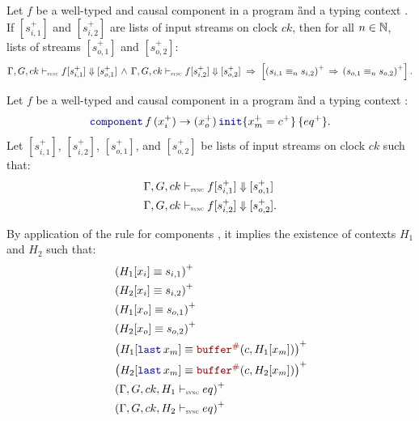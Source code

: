 \begin{theorem}[Determinism]
    \label{thm:semantics:grsync:theorems:determinism}
    Let $f$ be a well-typed and causal component in a program \G and a typing
    context \tyCtx. If $[s_{i, 1}^+]$ and $[s_{i, 2}^+]$ are lists of input streams on clock $ck$,
    then for all $n \in \mathbb{N}$, lists of streams $[s_{o, 1}^+]$ and $[s_{o, 2}^+]$:
    $$
        \Gamma, G, ck \vdash_{\textnormal{\tiny\textsc{sync}}} f[s_{i, 1}^+] \Downarrow [s_{o, 1}^+]
        \, \wedge \,
        \Gamma, G, ck \vdash_{\textnormal{\tiny\textsc{sync}}} f[s_{i, 2}^+] \Downarrow [s_{o, 2}^+]
        \; \Rightarrow \;
        \left[
            \left(s_{i, 1} \equiv_n s_{i, 2}\right)^+
            \, \Rightarrow \,
            \left(s_{o, 1} \equiv_n s_{o, 2}\right)^+
            \right].
    $$
\end{theorem}
\begin{skippableproof}
    Let $f$ be a well-typed and causal component in a program \G and a typing context \tyCtx:
    $$\component{f}{x_i^+}{x_o^+}{eq^+}{x_m^+ = c^+}.$$
    Let $[s_{i, 1}^+]$, $[s_{i, 2}^+]$, $[s_{o, 1}^+]$, and $[s_{o, 2}^+]$ be lists of input streams
    on  clock $ck$ such that:
    \begin{align*}
         & \Gamma, G, ck \vdash_{\textnormal{\tiny\textsc{sync}}} f[s_{i, 1}^+] \Downarrow [s_{o, 1}^+]  \\
         & \Gamma, G, ck \vdash_{\textnormal{\tiny\textsc{sync}}} f[s_{i, 2}^+] \Downarrow [s_{o, 2}^+].
    \end{align*}

    By application of the rule for components , it implies
    the existence of contexts $H_1$ and $H_2$ such that:
    \begin{align*}
         & \left(H_1[x_i] \equiv s_{i, 1}\right)^+                     \\
         & \left(H_2[x_i] \equiv s_{i, 2}\right)^+                     \\
         & \left(H_1[x_o] \equiv s_{o, 1}\right)^+                     \\
         & \left(H_2[x_o] \equiv s_{o, 2}\right)^+                     \\
         & \left(H_1[\last{x_m}] \equiv \buffer{c}{H_1[x_m]} \right)^+ \\
         & \left(H_2[\last{x_m}] \equiv \buffer{c}{H_2[x_m]} \right)^+ \\
         & \left(\eqDenot{H_1}{ck}{eq}\right)^+                        \\
         & \left(\eqDenot{H_2}{ck}{eq}\right)^+
    \end{align*}


\end{skippableproof}
